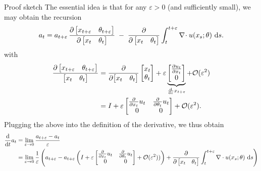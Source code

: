 \documentclass{scrartcl}
\begin{document}
\begin{proof*}{Proof sketch}
    The essential idea is that for any $\varepsilon > 0$ (and sufficiently small), we may obtain the recursion 
    \begin{equation}
        a_t
        = a_{t+\varepsilon}\,
        \frac{
          \partial \begin{bmatrix} x_{t+\varepsilon} & \theta_{t+\varepsilon} \end{bmatrix}
        }{
          \partial \begin{bmatrix} x_t & \theta_t \end{bmatrix}
        }
        \;-\;
        \frac{\partial}{\partial \begin{bmatrix} x_t & \theta_t \end{bmatrix}}
        \int_t^{t+\varepsilon} \nabla \!\cdot u(x_s;\theta)\, \d s.
    \end{equation}
    with
    \begin{align*}
        \frac{\partial \begin{bmatrix} x_{t+\varepsilon} & \theta_{t+\varepsilon} \end{bmatrix}}{\begin{bmatrix} x_t & \theta_t \end{bmatrix}} &= \frac{\partial}{\partial {\begin{bmatrix} x_t & \theta_t \end{bmatrix}}}\begin{bmatrix} x_t \\ \theta_t \end{bmatrix} + \varepsilon\underbrace{\begin{bmatrix} \frac{\partial u_t}{\partial x_t} \\ 0 \end{bmatrix}}_{\frac{\d}{\d \varepsilon} x_{t + \varepsilon}} + \mathcal{O}(\varepsilon^2)\\
        &= I + \varepsilon \begin{bmatrix} \frac{\partial}{\partial x_t} u_t & \frac{\partial}{\partial \theta_t} u_t \\ 0 & 0 \end{bmatrix} + \mathcal{O}(\varepsilon^2).
    \end{align*}
    Plugging the above into the definition of the derivative, we thus obtain
    \begin{align*}
    \frac{\d}{\d t} a_t &= \lim_{\varepsilon \to 0} \frac{a_{t+\varepsilon} - a_t}{\varepsilon}\\
                        &= \lim_{\varepsilon \to 0} \frac{1}{\varepsilon} \left(a_{t+\varepsilon} - a_{t + \varepsilon}\left(I + \varepsilon \begin{bmatrix} \frac{\partial}{\partial x_t} u_t & \frac{\partial}{\partial \theta_t} u_t \\ 0 & 0 \end{bmatrix} + \mathcal{O}(\varepsilon^2))\right) + \frac{\partial}{\partial \begin{bmatrix} x_t & \theta_t \end{bmatrix}} \int_t^{t + \varepsilon} \nabla \cdot u(x_s; \theta)\, \d s\right)\\

\end{align*}
\end{proof*}
\end{document}
